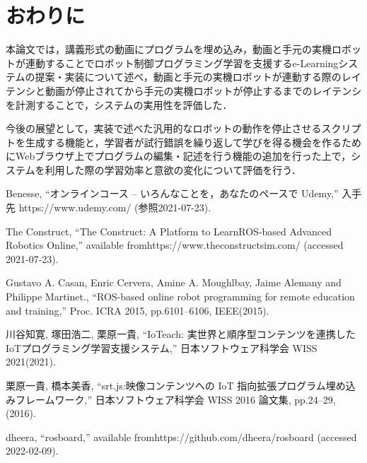 \documentclass{ujarticle}
\begin{document}
\section{おわりに}
本論文では，講義形式の動画にプログラムを埋め込み，動画と手元の実機ロボットが連動することでロボット制御プログラミング学習を支援するe-Learningシステムの提案・実装について述べ，動画と手元の実機ロボットが連動する際のレイテンシと動画が停止されてから手元の実機ロボットが停止するまでのレイテンシを計測することで，システムの実用性を評価した．
\par 今後の展望として，実装で述べた汎用的なロボットの動作を停止させるスクリプトを生成する機能と，学習者が試行錯誤を繰り返して学びを得る機会を作るためにWebブラウザ上でプログラムの編集・記述を行う機能の追加を行った上で，システムを利用した際の学習効率と意欲の変化について評価を行う．



\footnotesize
\begin{thebibliography}{99}
Benesse, ``オンラインコース -- いろんなことを，あなたのペースで \textbar Udemy,'' 入手先 https://www.udemy.com/ (参照2021-07-23).

The Construct, ``The Construct: A Platform to Learn\newline ROS-based Advanced Robotics Online,'' available from\newline https://www.theconstructsim.com/ (accessed 2021-07-23).

Gustavo A. Casan, Enric Cervera, Amine A. Moughlbay, Jaime Alemany and Philippe Martinet., ``ROS-based online robot programming for remote education and training,'' Proc. ICRA 2015, pp.6101--6106, IEEE(2015).

川谷知寛, 塚田浩二, 栗原一貴, ``IoTeach: 実世界と順序型コンテンツを連携したIoTプログラミング学習支援システム,'' 日本ソフトウェア科学会 WISS 2021(2021).

栗原一貴, 橋本美香, ``srt.js:映像コンテンツへの IoT 指向拡張プログラム埋め込みフレームワーク,'' 日本ソフトウェア科学会 WISS 2016 論文集, pp.24--29, (2016).

dheera, ``rosboard,'' available from\newline https://github.com/dheera/rosboard (accessed 2022-02-09).

\end{thebibliography}

\normalsize
\end{document}
